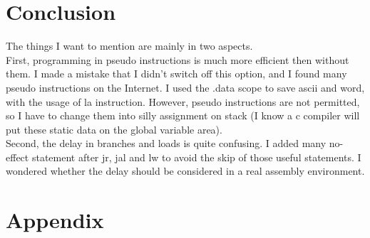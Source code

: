 \documentclass{article}
\begin{document}
\section{Conclusion}
The things I want to mention are mainly in two aspects.\\

First, programming in pseudo instructions is much more efficient then without them. I made a mistake that I didn't switch off this option, and I found many pseudo instructions on the Internet. I used the .data scope to save ascii and word, with the usage of la instruction. However, pseudo instructions are not permitted, so I have to change them into silly assignment on stack (I know a c compiler will put these static data on the global variable area).\\

Second, the delay in branches and loads is quite confusing. I added many no-effect statement after jr, jal and lw to avoid the skip of those useful statements. I wondered whether the delay should be considered in a real assembly environment.

\section{Appendix}
\inputminted{asm}{p1.s}
\end{document}
